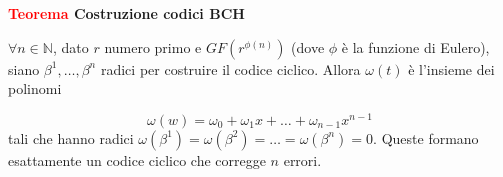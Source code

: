 \documentclass[12pt]{report}
\def\blankpage{%
    \clearpage%
    \thispagestyle{empty}%
    \addtocounter{page}{-1}%
    \null%
    \clearpage}
\begin{document}
    \vspace{5px}
    \begin{tcolorbox}
        \textbf{\textcolor{red}{Teorema} Costruzione codici BCH }
        \vspace{5px}
        \begin{center}

            $\forall n \in \mathbb{N}$, dato $r$ numero primo e $GF(r^{\phi(n)})$ (dove $\phi$ è la funzione di Eulero), siano $\beta^1,\dots,\beta^n$ radici per costruire il codice ciclico. Allora $\omega(t)$ è l'insieme dei polinomi

            $$\omega(w) = \omega_0 + \omega_1 x + \dots + \omega_{n-1} x^{n-1}$$
            tali che hanno radici $\omega(\beta^1)=\omega(\beta^2) = \dots = \omega(\beta^n) = 0$.
            Queste formano esattamente un codice ciclico che corregge $n$ errori.

        \end{center}
    \end{tcolorbox}

    \clearpage
    \pagecolor{color}
    \blankpage
    \nopagecolor
\end{document}
